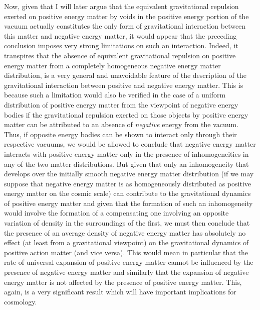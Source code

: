 \documentclass[notitlepage,12pt]{report}
\begin{document}
Now, given that I will later argue that the equivalent gravitational repulsion exerted on positive energy matter by voids in the positive energy portion of the vacuum actually constitutes the only form of gravitational interaction between this matter and negative energy matter, it would appear that the preceding conclusion imposes very strong limitations on such an interaction. Indeed, it transpires that the absence of equivalent gravitational repulsion on positive energy matter from a completely homogeneous negative energy matter distribution, is a very general and unavoidable feature of the description of the gravitational interaction between positive and negative energy matter. This is because such a limitation would also be verified in the case of a uniform distribution of positive energy matter from the viewpoint of negative energy bodies if the gravitational repulsion exerted on those objects by positive energy matter can be attributed to an absence of \textit{negative} energy from the vacuum. Thus, if opposite energy bodies can be shown to interact only through their respective vacuums, we would be allowed to conclude that negative energy matter interacts with positive energy matter only in the presence of inhomogeneities in any of the two matter distributions. But given that only an inhomogeneity that develops over the initially smooth negative energy matter distribution (if we may suppose that negative energy matter is as homogeneously distributed as positive energy matter on the cosmic scale) can contribute to the gravitational dynamics of positive energy matter and given that the formation of such an inhomogeneity would involve the formation of a compensating one involving an opposite variation of density in the surroundings of the first, we must then conclude that the presence of an average density of negative energy matter has absolutely no effect (at least from a gravitational viewpoint) on the gravitational dynamics of positive action matter (and vice versa). This would mean in particular that the rate of universal expansion of positive energy matter cannot be influenced by the presence of negative energy matter and similarly that the expansion of negative energy matter is not affected by the presence of positive energy matter. This, again, is a very significant result which will have important implications for cosmology.
\end{document}
